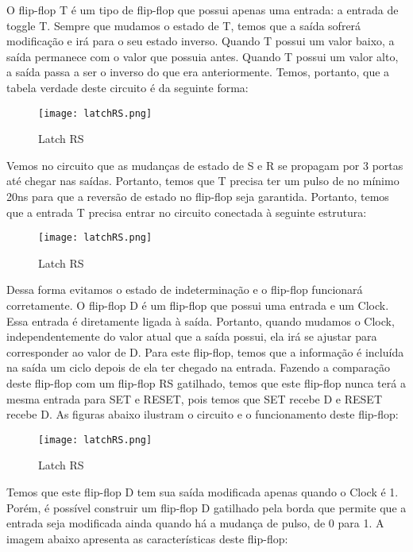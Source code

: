 \documentclass[12pt]{article}
\begin{document}
O flip-flop T é um tipo de flip-flop que possui apenas uma entrada: a entrada de toggle T. Sempre que mudamos o estado de T, temos que a saída sofrerá modificação e irá para o seu estado inverso. Quando T possui um valor baixo, a saída permanece com o valor que possuia antes. Quando T possui um valor alto, a saída passa a ser o inverso do que era anteriormente. Temos, portanto, que a tabela verdade deste circuito é da seguinte forma: 

\begin{figure}[H]
	\centering
	\texttt{[image: latchRS.png]}
	\caption{Latch RS}
	\label{fig:latRS}
\end{figure}

Vemos no circuito que as mudanças de estado de S e R se propagam por 3 portas até chegar nas saídas. Portanto, temos que T precisa ter um pulso de no mínimo 20ns para que a reversão de estado no flip-flop seja garantida. Portanto, temos que a entrada T precisa entrar no circuito conectada à seguinte estrutura:

\begin{figure}[H]
	\centering
	\texttt{[image: latchRS.png]}
	\caption{Latch RS}
	\label{fig:latRS}
\end{figure}

Dessa forma evitamos o estado de indeterminação e o flip-flop funcionará corretamente.
O flip-flop D é um flip-flop que possui uma entrada e um Clock. Essa entrada é diretamente ligada à saída. Portanto, quando mudamos o Clock, independentemente do valor atual que a saída possui, ela irá se ajustar para corresponder ao valor de D. Para este flip-flop, temos que a informação é incluída na saída um ciclo depois de ela ter chegado na entrada.
Fazendo a comparação deste flip-flop com um flip-flop RS gatilhado, temos que este flip-flop nunca terá a mesma entrada para SET e RESET, pois temos que SET recebe D e RESET recebe D. As figuras abaixo ilustram o circuito e o funcionamento deste flip-flop:

\begin{figure}[H]
	\centering
	\texttt{[image: latchRS.png]}
	\caption{Latch RS}
	\label{fig:latRS}
\end{figure}


Temos que este flip-flop D tem sua saída modificada apenas quando o Clock é 1. Porém, é possível construir um flip-flop D gatilhado pela borda que permite que a entrada seja modificada ainda quando há a mudança de pulso, de 0 para 1. A imagem abaixo apresenta as características deste flip-flop:
\end{document}
